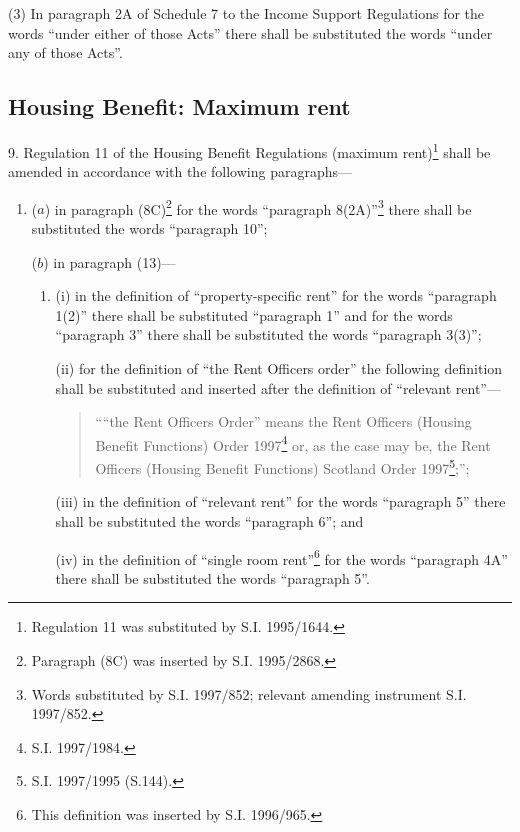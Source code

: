 \documentclass[12pt,a4paper]{article}
\begin{document}
(3) In paragraph 2A of Schedule 7 to the Income Support Regulations for the words “under either of those Acts” there shall be substituted the words “under any of those Acts”.

\subsection[9. Housing Benefit: Maximum rent]{Housing Benefit: Maximum rent}

9.  Regulation 11 of the Housing Benefit Regulations (maximum rent)\footnote{\frenchspacing Regulation 11 was substituted by S.I. 1995/1644.} shall be amended in accordance with the following paragraphs—
\begin{enumerate}\item[]
($a$) in paragraph (8C)\footnote{\frenchspacing Paragraph (8C) was inserted by S.I. 1995/2868.} for the words “paragraph 8(2A)”\footnote{\frenchspacing Words substituted by S.I. 1997/852; relevant amending instrument S.I. 1997/852.} there shall be substituted the words “paragraph 10”;

($b$) in paragraph (13)—
\begin{enumerate}\item[]
(i) in the definition of “property-specific rent” for the words “paragraph 1(2)” there shall be substituted “paragraph 1” and for the words “paragraph 3” there shall be substituted the words “paragraph 3(3)”;

(ii) for the definition of “the Rent Officers order” the following definition shall be substituted and inserted after the definition of “relevant rent”—
\begin{quotation}
““the Rent Officers Order” means the Rent Officers (Housing Benefit Functions) Order 1997\footnote{\frenchspacing S.I. 1997/1984.} or, as the case may be, the Rent Officers (Housing Benefit Functions) Scotland Order 1997\footnote{\frenchspacing S.I. 1997/1995 (S.144).};”;
\end{quotation}

(iii) in the definition of “relevant rent” for the words “paragraph 5” there shall be substituted the words “paragraph 6”; and

(iv) in the definition of “single room rent”\footnote{\frenchspacing This definition was inserted by S.I. 1996/965.} for the words “paragraph 4A” there shall be substituted the words “paragraph 5”.
\end{enumerate}
\end{enumerate}
\end{document}
